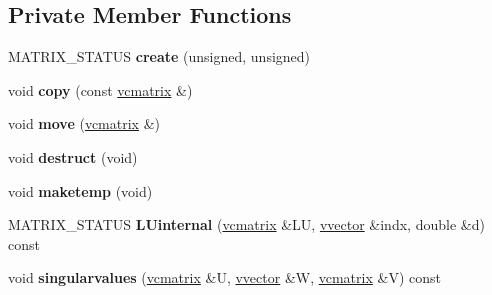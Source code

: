 \subsection*{Private Member Functions}
\begin{DoxyCompactItemize}
\item 
M\+A\+T\+R\+I\+X\+\_\+\+S\+T\+A\+T\+US {\bfseries create} (unsigned, unsigned)\hypertarget{classvcmatrix_aa4365b875da733d68794fa44087ae248}{}\label{classvcmatrix_aa4365b875da733d68794fa44087ae248}

\item 
void {\bfseries copy} (const \hyperlink{classvcmatrix}{vcmatrix} \&)\hypertarget{classvcmatrix_a6f7dd70ba67cdadbfc6fad58e14cfd5e}{}\label{classvcmatrix_a6f7dd70ba67cdadbfc6fad58e14cfd5e}

\item 
void {\bfseries move} (\hyperlink{classvcmatrix}{vcmatrix} \&)\hypertarget{classvcmatrix_a5faf15359f01c666cc4edd64ead4ff8a}{}\label{classvcmatrix_a5faf15359f01c666cc4edd64ead4ff8a}

\item 
void {\bfseries destruct} (void)\hypertarget{classvcmatrix_a126053fb7498c87e641b15424b5f3eaa}{}\label{classvcmatrix_a126053fb7498c87e641b15424b5f3eaa}

\item 
void {\bfseries maketemp} (void)\hypertarget{classvcmatrix_ab2d52c5b5c4f03db9c9dadf48192522f}{}\label{classvcmatrix_ab2d52c5b5c4f03db9c9dadf48192522f}

\item 
M\+A\+T\+R\+I\+X\+\_\+\+S\+T\+A\+T\+US {\bfseries L\+Uinternal} (\hyperlink{classvcmatrix}{vcmatrix} \&LU, \hyperlink{classvvector}{vvector} \&indx, double \&d) const \hypertarget{classvcmatrix_affc99c0582feed8b1246be4cfee543b0}{}\label{classvcmatrix_affc99c0582feed8b1246be4cfee543b0}

\item 
void {\bfseries singularvalues} (\hyperlink{classvcmatrix}{vcmatrix} \&U, \hyperlink{classvvector}{vvector} \&W, \hyperlink{classvcmatrix}{vcmatrix} \&V) const \hypertarget{classvcmatrix_aadd096dfa0b3c3de7d955359fe3df7c3}{}\label{classvcmatrix_aadd096dfa0b3c3de7d955359fe3df7c3}

\end{DoxyCompactItemize}
